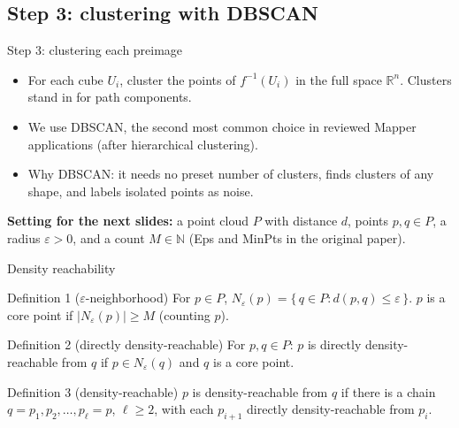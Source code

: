 \documentclass[aspectratio=169]{beamer}
\newcommand{\R}{\mathbb{R}}
\newcommand{\N}{\mathbb{N}}
\newcommand{\src}[1]{\par\vspace{2pt}\hfill{\scriptsize\textcolor{gray}{\parencite{#1}}}}
\begin{document}
\subsection{Step 3: clustering with DBSCAN}
\begin{frame}{Step 3: clustering each preimage}
\begin{itemize}
  \item For each cube $U_i$, cluster the points of $f^{-1}(U_i)$ in the full space $\R^n$. Clusters stand in for path components. \hfill\parencite{singh2007mapper}
  \item We use \alert{DBSCAN}, the second most common choice in reviewed Mapper applications (after hierarchical clustering). \hfill\parencite{madukpe2026review}
  \item Why DBSCAN: it needs no preset number of clusters, finds clusters of any shape, and labels isolated points as \alert{noise}. \hfill\parencite{ester1996dbscan}
\end{itemize}
\vspace{6pt}
\textbf{Setting for the next slides:} a point cloud $P$ with distance $d$, points $p, q \in P$, a radius $\varepsilon > 0$, and a count $M \in \N$ (Eps and MinPts in the original paper).
\end{frame}

\begin{frame}{Density reachability}
\begin{block}{Definition 1 ($\varepsilon$-neighborhood)}
For $p \in P$, $N_\varepsilon(p) = \{\, q \in P : d(p,q) \le \varepsilon \,\}$. \quad $p$ is a \alert{core point} if $|N_\varepsilon(p)| \ge M$ (counting $p$).
\src{ester1996dbscan}
\end{block}
\begin{block}{Definition 2 (directly density-reachable)}
For $p, q \in P$: $p$ is directly density-reachable from $q$ if $p \in N_\varepsilon(q)$ and $q$ is a core point.
\src{ester1996dbscan}
\end{block}
\begin{block}{Definition 3 (density-reachable)}
$p$ is density-reachable from $q$ if there is a chain $q = p_1, p_2, \dots, p_\ell = p$, $\ell \ge 2$, with each $p_{i+1}$ directly density-reachable from $p_i$.
\src{ester1996dbscan}
\end{block}
\end{frame}
\end{document}
